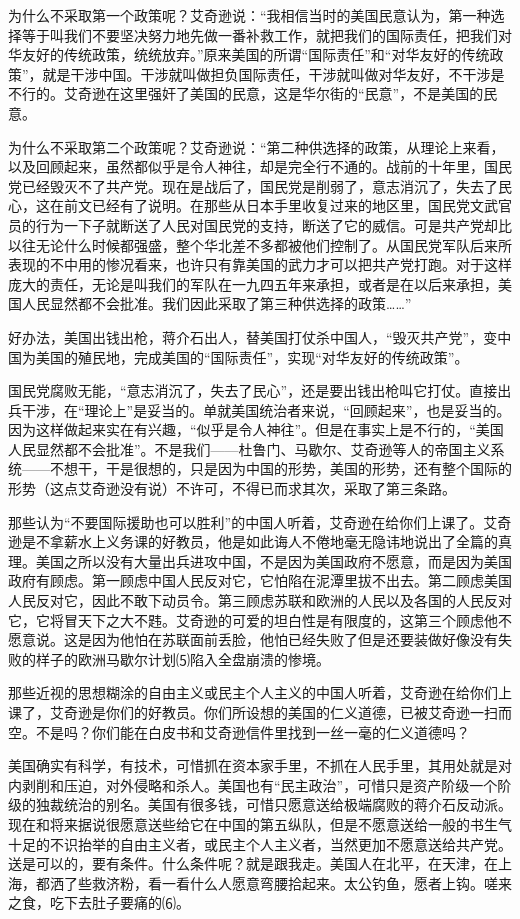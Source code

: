 \documentclass[UTF-8, a5paper, 12pt]{ctexart}
\begin{document}
为什么不采取第一个政策呢？艾奇逊说：“我相信当时的美国民意认为，第一种选择等于叫我们不要坚决努力地先做一番补救工作，就把我们的国际责任，把我们对华友好的传统政策，统统放弃。”原来美国的所谓“国际责任”和“对华友好的传统政策”，就是干涉中国。干涉就叫做担负国际责任，干涉就叫做对华友好，不干涉是不行的。艾奇逊在这里强奸了美国的民意，这是华尔街的“民意”，不是美国的民意。

为什么不采取第二个政策呢？艾奇逊说：“第二种供选择的政策，从理论上来看，以及回顾起来，虽然都似乎是令人神往，却是完全行不通的。战前的十年里，国民党已经毁灭不了共产党。现在是战后了，国民党是削弱了，意志消沉了，失去了民心，这在前文已经有了说明。在那些从日本手里收复过来的地区里，国民党文武官员的行为一下子就断送了人民对国民党的支持，断送了它的威信。可是共产党却比以往无论什么时候都强盛，整个华北差不多都被他们控制了。从国民党军队后来所表现的不中用的惨况看来，也许只有靠美国的武力才可以把共产党打跑。对于这样庞大的责任，无论是叫我们的军队在一九四五年来承担，或者是在以后来承担，美国人民显然都不会批准。我们因此采取了第三种供选择的政策……”

好办法，美国出钱出枪，蒋介石出人，替美国打仗杀中国人，“毁灭共产党”，变中国为美国的殖民地，完成美国的“国际责任”，实现“对华友好的传统政策”。

国民党腐败无能，“意志消沉了，失去了民心”，还是要出钱出枪叫它打仗。直接出兵干涉，在“理论上”是妥当的。单就美国统治者来说，“回顾起来”，也是妥当的。因为这样做起来实在有兴趣，“似乎是令人神往”。但是在事实上是不行的，“美国人民显然都不会批准”。不是我们——杜鲁门、马歇尔、艾奇逊等人的帝国主义系统——不想干，干是很想的，只是因为中国的形势，美国的形势，还有整个国际的形势（这点艾奇逊没有说）不许可，不得已而求其次，采取了第三条路。

那些认为“不要国际援助也可以胜利”的中国人听着，艾奇逊在给你们上课了。艾奇逊是不拿薪水上义务课的好教员，他是如此诲人不倦地毫无隐讳地说出了全篇的真理。美国之所以没有大量出兵进攻中国，不是因为美国政府不愿意，而是因为美国政府有顾虑。第一顾虑中国人民反对它，它怕陷在泥潭里拔不出去。第二顾虑美国人民反对它，因此不敢下动员令。第三顾虑苏联和欧洲的人民以及各国的人民反对它，它将冒天下之大不韪。艾奇逊的可爱的坦白性是有限度的，这第三个顾虑他不愿意说。这是因为他怕在苏联面前丢脸，他怕已经失败了但是还要装做好像没有失败的样子的欧洲马歇尔计划⑸陷入全盘崩溃的惨境。

那些近视的思想糊涂的自由主义或民主个人主义的中国人听着，艾奇逊在给你们上课了，艾奇逊是你们的好教员。你们所设想的美国的仁义道德，已被艾奇逊一扫而空。不是吗？你们能在白皮书和艾奇逊信件里找到一丝一毫的仁义道德吗？

美国确实有科学，有技术，可惜抓在资本家手里，不抓在人民手里，其用处就是对内剥削和压迫，对外侵略和杀人。美国也有“民主政治”，可惜只是资产阶级一个阶级的独裁统治的别名。美国有很多钱，可惜只愿意送给极端腐败的蒋介石反动派。现在和将来据说很愿意送些给它在中国的第五纵队，但是不愿意送给一般的书生气十足的不识抬举的自由主义者，或民主个人主义者，当然更加不愿意送给共产党。送是可以的，要有条件。什么条件呢？就是跟我走。美国人在北平，在天津，在上海，都洒了些救济粉，看一看什么人愿意弯腰拾起来。太公钓鱼，愿者上钩。嗟来之食，吃下去肚子要痛的⑹。
\end{document}
